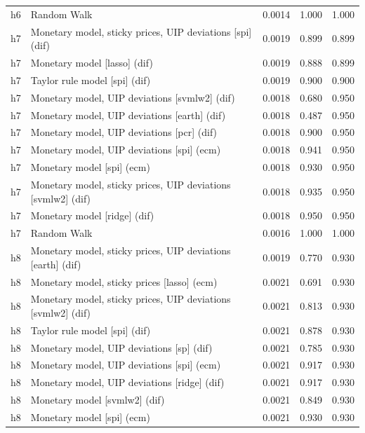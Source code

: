 \begin{ThreePartTable}
\begin{longtable}[t]{cp{5.5cm}ccc}
h6 & \raggedright Random Walk & 0.0014 & 1.000 & 1.000\\
\addlinespace
h7 & \raggedright Monetary model, sticky prices, UIP deviations [spi] (dif) & 0.0019 & 0.899 & 0.899\\
h7 & \raggedright Monetary model [lasso] (dif) & 0.0019 & 0.888 & 0.899\\
h7 & \raggedright Taylor rule model [spi] (dif) & 0.0019 & 0.900 & 0.900\\
h7 & \raggedright Monetary model, UIP deviations [svmlw2] (dif) & 0.0018 & 0.680 & 0.950\\
h7 & \raggedright Monetary model, UIP deviations [earth] (dif) & 0.0018 & 0.487 & 0.950\\
h7 & \raggedright Monetary model, UIP deviations [pcr] (dif) & 0.0018 & 0.900 & 0.950\\
h7 & \raggedright Monetary model, UIP deviations [spi] (ecm) & 0.0018 & 0.941 & 0.950\\
h7 & \raggedright Monetary model [spi] (ecm) & 0.0018 & 0.930 & 0.950\\
h7 & \raggedright Monetary model, sticky prices, UIP deviations [svmlw2] (dif) & 0.0018 & 0.935 & 0.950\\
h7 & \raggedright Monetary model [ridge] (dif) & 0.0018 & 0.950 & 0.950\\
h7 & \raggedright Random Walk & 0.0016 & 1.000 & 1.000\\
\addlinespace
h8 & \raggedright Monetary model, sticky prices, UIP deviations [earth] (dif) & 0.0019 & 0.770 & 0.930\\
h8 & \raggedright Monetary model, sticky prices [lasso] (ecm) & 0.0021 & 0.691 & 0.930\\
h8 & \raggedright Monetary model, sticky prices, UIP deviations [svmlw2] (dif) & 0.0021 & 0.813 & 0.930\\
h8 & \raggedright Taylor rule model [spi] (dif) & 0.0021 & 0.878 & 0.930\\
h8 & \raggedright Monetary model, UIP deviations [sp] (dif) & 0.0021 & 0.785 & 0.930\\
h8 & \raggedright Monetary model, UIP deviations [spi] (ecm) & 0.0021 & 0.917 & 0.930\\
h8 & \raggedright Monetary model, UIP deviations [ridge] (dif) & 0.0021 & 0.917 & 0.930\\
h8 & \raggedright Monetary model [svmlw2] (dif) & 0.0021 & 0.849 & 0.930\\
h8 & \raggedright Monetary model [spi] (ecm) & 0.0021 & 0.930 & 0.930\\

\end{longtable}
\end{ThreePartTable}
